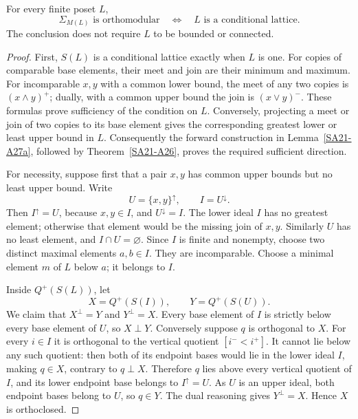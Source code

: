 \begin{theorem}
\label{SA21-A27}
For every finite poset $L$,
\[
 \Sigma_{M(L)}\text{ is orthomodular}
 \quad\Longleftrightarrow\quad
 L\text{ is a conditional lattice}.
\]
The conclusion does not require $L$ to be bounded or connected.
\end{theorem}
\begin{proof}
First, $S(L)$ is a conditional lattice exactly when $L$ is one.
For copies of comparable base elements, their meet and join are their
minimum and maximum. For incomparable $x,y$ with a common lower
bound, the meet of any two copies is $(x\wedge y)^+$; dually, with a
common upper bound the join is $(x\vee y)^-$. These formulas prove
sufficiency of the condition on $L$. Conversely, projecting a meet or
join of two copies to its base element gives the corresponding
greatest lower or least upper bound in $L$. Consequently the forward
construction in Lemma~\ref{SA21-A27a}, followed by
Theorem~\ref{SA21-A26}, proves the required sufficient direction.

For necessity, suppose first that a pair $x,y$ has common upper
bounds but no least upper bound. Write
\[
 U=\{x,y\}^{\uparrow},\qquad I=U^{\downarrow}.
\]
Then $I^{\uparrow}=U$, because $x,y\in I$, and $U^{\downarrow}=I$.
The lower ideal $I$ has no greatest element; otherwise that element
would be the missing join of $x,y$. Similarly $U$ has no least
element, and $I\cap U=\varnothing$. Since $I$ is finite and nonempty,
choose two distinct maximal elements $a,b\in I$. They are incomparable.
Choose a minimal element $m$ of $L$ below $a$; it belongs to $I$.

Inside $Q^+(S(L))$, let
\[
 X=Q^+(S(I)),\qquad Y=Q^+(S(U)).
\]
We claim that $X^{\perp}=Y$ and $Y^{\perp}=X$. Every base element
of $I$ is strictly below every base element of $U$, so $X\perp Y$.
Conversely suppose $q$ is orthogonal to $X$. For every $i\in I$
it is orthogonal to the vertical quotient $[i^-<i^+]$.
It cannot lie below any such quotient: then both of its endpoint
bases would lie in the lower ideal $I$, making $q\in X$, contrary
to $q\perp X$. Therefore $q$ lies above every vertical quotient of
$I$, and its lower endpoint base belongs to $I^{\uparrow}=U$.
As $U$ is an upper ideal, both endpoint bases belong to $U$, so
$q\in Y$. The dual reasoning gives $Y^{\perp}=X$. Hence $X$ is
orthoclosed.


\end{proof}
